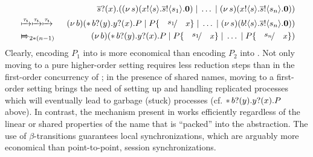 \documentclass[runningheads]{llncs}
\begin{document}
{{\begin{eqnarray*}
& & \qquad \qquad \binp{\dual{s}}{x} (\newsp{s}{\bout{x}{s} \bout{\dual{s}}{s_1} \inact} \Par \dots \Par \newsp{s}{\bout{x}{s} \bout{\dual{s}}{s_n}\inact})
	\\
	& \hby{\stau}  \hby{\stau} \hby{\stau} & 
	\newsp{b}{\repl \binp{b}{y} \binp{y}{x} P \Par P\subst{s_1}{x} \Par \dots \Par \newsp{s}{\bout{b}{s} \bout{\dual{s}}{s_n} \inact}}
	\\
	& \Hby{}_{2*(n - 1)} & 
	\newsp{b}{\repl \binp{b}{y} \binp{y}{x} P \Par P\subst{s_1}{x} \Par \dots \Par P\subst{s_n}{x}}
\end{eqnarray*}
Clearly, encoding $P_1$ into \HO is more economical than 
encoding $P_2$ into \sessp. Not only moving to a pure higher-order setting requires less reduction steps than in the first-order concurrency of \sessp; in the presence of shared names, moving to a first-order setting brings the need of setting up and handling replicated processes which will eventually lead to garbage (stuck) processes (cf. $\ast\, b ? (y) . y ? (x) . P$ above). In contrast, the mechanism present in \HO works efficiently regardless of the linear or shared properties of the name that is ``packed'' into the abstraction. 
The use of $\beta$-transitions guarantees local synchronizations, which are arguably more economical than point-to-point, session synchronizations.

}}
\end{document}
